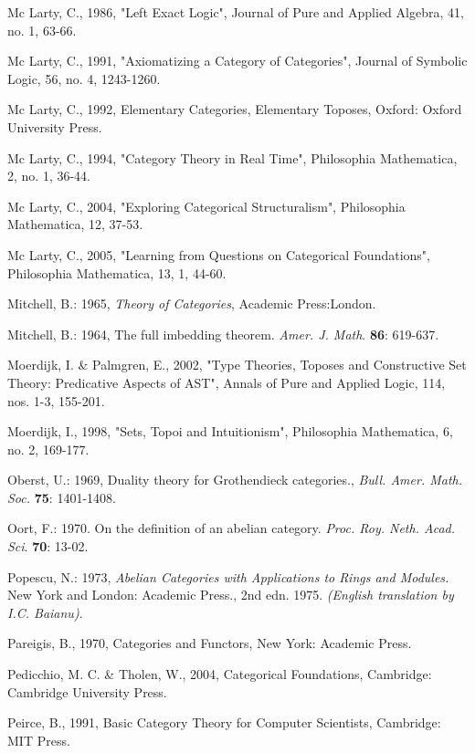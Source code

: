 \documentclass[12pt]{article}
\begin{document}
\begin{thebibliography}{199}
Mc Larty, C., 1986, "Left Exact Logic", Journal of Pure and Applied Algebra, 41, no. 1, 63-66.

Mc Larty, C., 1991, "Axiomatizing a Category of Categories", Journal of Symbolic Logic, 56, no. 4, 
1243-1260. 

Mc Larty, C., 1992, Elementary Categories, Elementary Toposes, Oxford: Oxford University Press.

Mc Larty, C., 1994, "Category Theory in Real Time", Philosophia Mathematica, 2, no. 1, 36-44.

Mc Larty, C., 2004, "Exploring Categorical Structuralism", Philosophia Mathematica, 12, 37-53.

Mc Larty, C., 2005, "Learning from Questions on Categorical Foundations", 
Philosophia Mathematica, 13, 1, 44-60.

Mitchell, B.: 1965, \emph{Theory of Categories}, Academic Press:London.

Mitchell, B.: 1964, The full imbedding theorem. \emph{Amer. J. Math}. \textbf{86}: 619-637.

Moerdijk, I. \& Palmgren, E., 2002, "Type Theories, Toposes and Constructive Set Theory: Predicative Aspects of AST", Annals of Pure and Applied Logic, 114, nos. 1-3, 155-201. 

Moerdijk, I., 1998, "Sets, Topoi and Intuitionism", Philosophia Mathematica, 6, no. 2, 169-177.

Oberst, U.: 1969, Duality theory for Grothendieck categories., \emph{Bull. Amer. Math. Soc.} \textbf{75}: 1401-1408.

Oort, F.: 1970. On the definition of an abelian category.
\emph{Proc. Roy. Neth. Acad. Sci}. \textbf{70}: 13-02.

Popescu, N.: 1973, \emph{Abelian Categories with Applications to
Rings and Modules.} New York and London: Academic Press., 2nd edn.
1975. \emph{(English translation by I.C. Baianu)}.

Pareigis, B., 1970, Categories and Functors, New York: Academic Press. 

Pedicchio, M. C. \& Tholen, W., 2004, Categorical Foundations, Cambridge: Cambridge University Press. 

Peirce, B., 1991, Basic Category Theory for Computer Scientists, Cambridge: MIT Press. 


\end{thebibliography}
\end{document}
